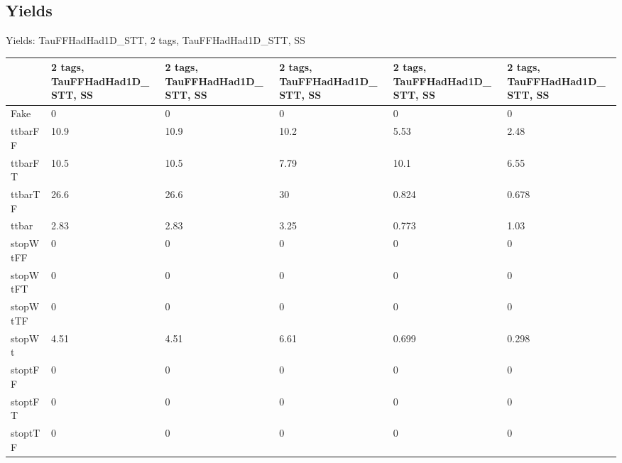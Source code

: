 
\subsection{Yields}

\begin{frame}{Yields: TauFFHadHad1D\_STT, 2 tags, TauFFHadHad1D\_STT, SS}
\begin{center}
  \begin{tabular}{l| >{\centering\let\newline\\\arraybackslash\hspace{0pt}}m{1.4cm}| >{\centering\let\newline\\\arraybackslash\hspace{0pt}}m{1.4cm}| >{\centering\let\newline\\\arraybackslash\hspace{0pt}}m{1.4cm}| >{\centering\let\newline\\\arraybackslash\hspace{0pt}}m{1.4cm}| >{\centering\let\newline\\\arraybackslash\hspace{0pt}}m{1.4cm}}
    & 2 tags, TauFFHadHad1D\_STT, SS & 2 tags, TauFFHadHad1D\_STT, SS & 2 tags, TauFFHadHad1D\_STT, SS & 2 tags, TauFFHadHad1D\_STT, SS & 2 tags, TauFFHadHad1D\_STT, SS \\
 \hline \hline
    Fake& 0 & 0 & 0 & 0 & 0 \\
 \hline
    ttbarFF& 10.9 & 10.9 & 10.2 & 5.53 & 2.48 \\
 \hline
    ttbarFT& 10.5 & 10.5 & 7.79 & 10.1 & 6.55 \\
 \hline
    ttbarTF& 26.6 & 26.6 & 30 & 0.824 & 0.678 \\
 \hline
    ttbar& 2.83 & 2.83 & 3.25 & 0.773 & 1.03 \\
 \hline
    stopWtFF& 0 & 0 & 0 & 0 & 0 \\
 \hline
    stopWtFT& 0 & 0 & 0 & 0 & 0 \\
 \hline
    stopWtTF& 0 & 0 & 0 & 0 & 0 \\
 \hline
    stopWt& 4.51 & 4.51 & 6.61 & 0.699 & 0.298 \\
 \hline
    stoptFF& 0 & 0 & 0 & 0 & 0 \\
 \hline
    stoptFT& 0 & 0 & 0 & 0 & 0 \\
 \hline
    stoptTF& 0 & 0 & 0 & 0 & 0 \\

\end{tabular}
\end{center}
\end{frame}
